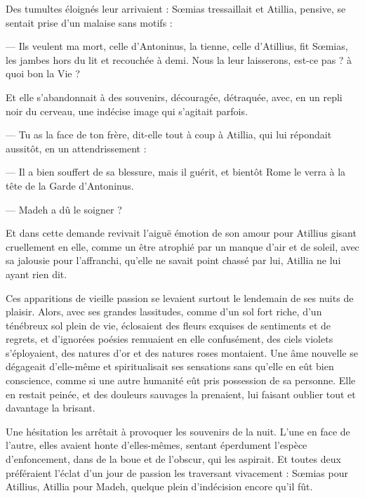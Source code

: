 \documentclass[a4paper, 11pt, oneside, polutonikogreek, french]{article}
\begin{document}
Des tumultes éloignés leur arrivaient : Sœmias tressaillait et Atillia, pensive, se sentait prise d'un malaise sans motifs :

--- Ils veulent ma mort, celle d'Antoninus, la tienne, celle d'Atillius, fit Sœmias, les jambes hors du lit et recouchée à demi. Nous la leur laisserons, est-ce pas ? à quoi bon la Vie ?

Et elle s'abandonnait à des souvenirs, découragée, détraquée, avec, en un repli noir du cerveau, une indécise image qui s'agitait parfois.

--- Tu as la face de ton frère, dit-elle tout à coup à Atillia, qui lui répondait aussitôt, en un attendrissement :

--- Il a bien souffert de sa blessure, mais il guérit, et bientôt Rome le verra à la tête de la Garde d'Antoninus.

--- Madeh a dû le soigner ?

Et dans cette demande revivait l'aiguë émotion de son amour pour Atillius gisant cruellement en elle, comme un être atrophié par un manque d'air et de soleil, avec sa jalousie pour l'affranchi, qu'elle ne savait point chassé par lui, Atillia ne lui ayant rien dit.

Ces apparitions de vieille passion se levaient surtout le lendemain de ses nuits de plaisir. Alors, avec ses grandes lassitudes, comme d'un sol fort riche, d'un ténébreux sol plein de vie, éclosaient des fleurs exquises de sentiments et de regrets, et d'ignorées poésies remuaient en elle confusément, des ciels violets s'éployaient, des natures d'or et des natures roses montaient. Une âme nouvelle se dégageait d'elle-même et spiritualisait ses sensations sans qu'elle en eût bien conscience, comme si une autre humanité eût pris possession de sa personne. Elle en restait peinée, et des douleurs sauvages la prenaient, lui faisant oublier tout et davantage la brisant.

Une hésitation les arrêtait à provoquer les souvenirs de la nuit. L'une en face de l'autre, elles avaient honte d'elles-mêmes, sentant éperdument l'espèce d'enfoncement, dans de la boue et de l'obscur, qui les aspirait. Et toutes deux préféraient l'éclat d'un jour de passion les traversant vivacement : Sœmias pour Atillius, Atillia pour Madeh, quelque plein d'indécision encore qu'il fût.
\end{document}
